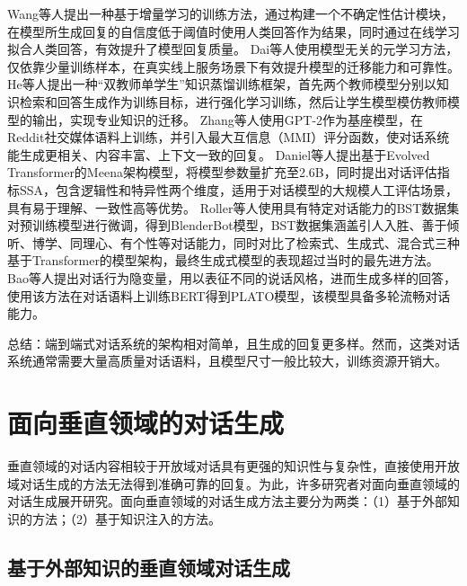 Wang等人\cite{DBLP:conf/acl/WangZLHZL19}提出一种基于增量学习的训练方法，通过构建一个不确定性估计模块，在模型所生成回复的自信度低于阈值时使用人类回答作为结果，同时通过在线学习拟合人类回答，有效提升了模型回复质量。
Dai等人\cite{DBLP:conf/acl/DaiLTLSZ20}使用模型无关的元学习方法，仅依靠少量训练样本，在真实线上服务场景下有效提升模型的迁移能力和可靠性。
He等人\cite{DBLP:conf/emnlp/HeYYLSX20}提出一种“双教师单学生”知识蒸馏训练框架，首先两个教师模型分别以知识检索和回答生成作为训练目标，进行强化学习训练，然后让学生模型模仿教师模型的输出，实现专业知识的迁移。
Zhang等人\cite{DBLP:conf/acl/ZhangSGCBGGLD20}使用GPT-2\cite{radford2019language}作为基座模型，在Reddit社交媒体语料上训练，并引入最大互信息（MMI）评分函数，使对话系统能生成更相关、内容丰富、上下文一致的回复。
Daniel等人\cite{DBLP:journals/corr/abs-2001-09977}提出基于Evolved Transformer的Meena架构模型，将模型参数量扩充至2.6B，同时提出对话评估指标SSA，包含逻辑性和特异性两个维度，适用于对话模型的大规模人工评估场景，具有易于理解、一致性高等优势。
Roller等人\cite{DBLP:conf/eacl/RollerDGJWLXOSB21}使用具有特定对话能力的BST数据集对预训练模型进行微调，得到BlenderBot模型，BST数据集涵盖引人入胜、善于倾听、博学、同理心、有个性等对话能力，同时对比了检索式、生成式、混合式三种基于Transformer的模型架构，最终生成式模型的表现超过当时的最先进方法。
Bao等人\cite{DBLP:conf/acl/BaoHWWW20}提出对话行为隐变量，用以表征不同的说话风格，进而生成多样的回答，使用该方法在对话语料上训练BERT得到PLATO模型，该模型具备多轮流畅对话能力。

总结：端到端式对话系统的架构相对简单，且生成的回复更多样。然而，这类对话系统通常需要大量高质量对话语料，且模型尺寸一般比较大，训练资源开销大。

\section{面向垂直领域的对话生成}

垂直领域的对话内容相较于开放域对话具有更强的知识性与复杂性，直接使用开放域对话生成的方法无法得到准确可靠的回复。为此，许多研究者对面向垂直领域的对话生成展开研究。面向垂直领域的对话生成方法主要分为两类：（1）基于外部知识的方法；（2）基于知识注入的方法。

\subsection{基于外部知识的垂直领域对话生成}

